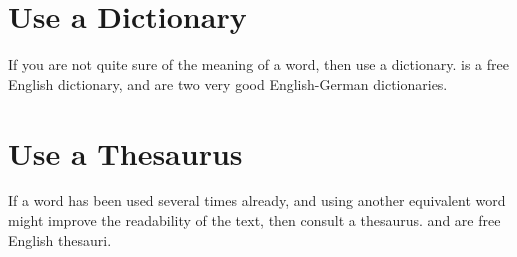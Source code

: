 \section{Use a Dictionary}

If you are not quite sure of the meaning of a word, then use a
dictionary.  \citet{DictionaryCom} is a free English dictionary,
\citet{DictChemnitz} and \citet{DictLeoOrg} are two very good
English-German dictionaries.




\section{Use a Thesaurus}

If a word has been used several times already, and using another
equivalent word might improve the readability of the text, then
consult a thesaurus. \citet{Roget} and \citet{RogetInt} are free
English thesauri.


